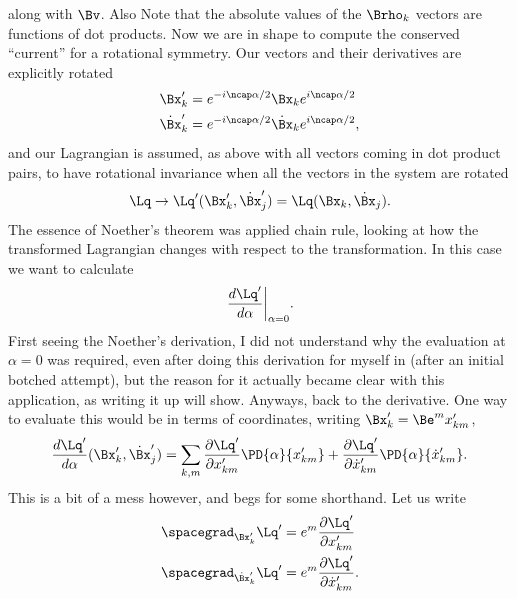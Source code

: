 {along with \(\Bv\).  Also Note that the absolute values of the \(\Brho_k\) vectors are functions of dot products.
%
Now we are in shape to compute the conserved ``current'' for a rotational symmetry.  Our vectors and their derivatives are explicitly rotated
%
\begin{equation}\label{eqn:goldsteinCh12:320}
\begin{aligned}
{\Bx}_k' &= e^{-i\ncap \alpha/2} {\Bx}_k e^{i\ncap\alpha/2} \\
\dot{\Bx}_k' &= e^{-i\ncap \alpha/2} \dot{\Bx}_k e^{i\ncap\alpha/2},
\end{aligned}
\end{equation}
%
and our Lagrangian is assumed, as above with all vectors coming in dot product pairs, to have rotational invariance when all the vectors in the system are rotated
%
\begin{equation}\label{eqn:goldsteinCh12:340}
\Lq  \rightarrow \Lq'(\Bx_k', \dot{\Bx}_j') = \Lq(\Bx_k, \dot{\Bx}_j) .
\end{equation}
%
The essence of Noether's theorem was applied chain rule, looking at how the transformed Lagrangian changes with respect to the transformation.  In this case
we want to calculate
%
\begin{equation}\label{eqn:goldsteinCh12:360}
{\left. \frac{d \Lq'}{d\alpha} \right\vert}_{\alpha=0}.
\end{equation}
%
First seeing the Noether's derivation, I did not understand why the evaluation at \(\alpha=0\) was required, even after doing this
derivation for myself in  (after an initial botched attempt), but
the reason for it actually became clear with this application, as writing it up will show.
%
Anyways, back to the derivative.  One way to evaluate this would be in terms of coordinates, writing \(\Bx_k' = \Be^m x_{km}'\),
%
\begin{equation}\label{eqn:goldsteinCh12:380}
\frac{d \Lq'}{d\alpha} (\Bx_k', \dot{\Bx}_j')
= \sum_{k,m} \frac{\partial \Lq'}{\partial x_{km}'} \PD{\alpha}{x_{km}'} + \frac{\partial \Lq'}{\partial \dot{x}_{km}'} \PD{\alpha}{\dot{x}_{km}'} .
\end{equation}
%
This is a bit of a mess however, and begs for some shorthand.  Let us write
%
\begin{equation}\label{eqn:goldsteinCh12:400}
\begin{aligned}
\spacegrad_{\Bx_k'} \Lq' &= e^m \frac{\partial \Lq'}{\partial x_{km}'} \\
\spacegrad_{\dot{\Bx}_k'} \Lq' &= e^m \frac{\partial \Lq'}{\partial \dot{x}_{km}'}.

\end{aligned}
\end{equation}}
